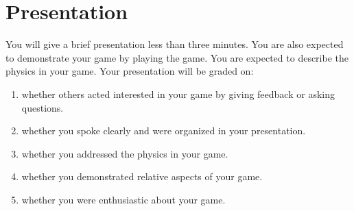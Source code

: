 \section*{Presentation}

You will give a brief presentation less than three minutes. You are also expected to demonstrate your game by playing the game. You  are expected to describe the physics in your game. Your presentation will be graded on:

\begin{enumerate}
	\item whether others acted interested in your game by giving feedback or asking questions.
	\item whether you spoke clearly and were organized in your presentation.
	\item whether you addressed the physics in your game.
	\item whether you demonstrated relative aspects of your game.
	\item whether you were enthusiastic about your game.
\end{enumerate}

